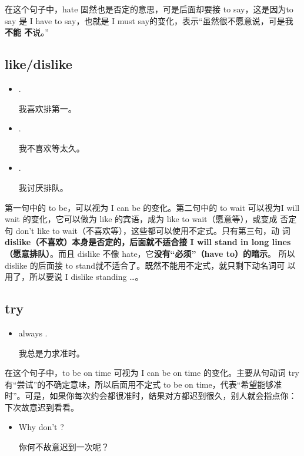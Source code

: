 在这个句子中，hate 固然也是否定的意思，可是后面却要接 to say，这是因为to say
是 I have to say，也就是 I must say的变化，表示“虽然很不愿意说，可是我\textbf{不能
  不}说。”

\subsection{like/dislike}

\begin{itemize}
\item {}  .

  我喜欢排第一。
\item {}  .

  我不喜欢等太久。
\item {}  .

  我讨厌排队。
\end{itemize}

第一句中的 to be，可以视为 I can be 的变化。第二句中的 to wait 可以视为I
will wait 的变化，它可以做为 like 的宾语，成为 like to wait（愿意等），或变成
否定句 don't like to wait（不喜欢等），这些都可以使用不定式。只有第三句，动
词\textbf{dislike（不喜欢）本身是否定的，后面就不适合接 I will stand in long
  lines（愿意排队）}。而且 dislike 不像 hate，它\textbf{没有“必须”（have to）的暗示}。
所以 dislike 的后面接 to stand就不适合了。既然不能用不定式，就只剩下动名词可
以用了，所以要说 I dislike standing \ldots。

\subsection{try}

\begin{itemize}
\item  {} always  .

  我总是力求准时。
\end{itemize}

在这个句子中，to be on time 可视为 I can be on time 的变化。主要从句动词
try 有“尝试”的不确定意味，所以后面用不定式 to be on
time，代表“希望能够准时”。可是，如果你每次约会都很准时，结果对方都迟到很久，别人就会指点你：下次故意迟到看看。

\begin{itemize}
\item  Why don't   ?

  你何不故意迟到一次呢？
\end{itemize}

